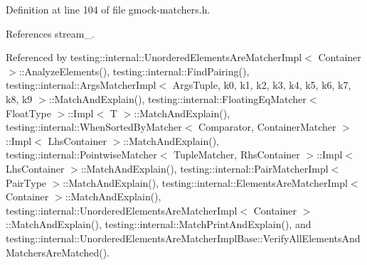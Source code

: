 Definition at line 104 of file gmock-\/matchers.\+h.



References stream\+\_\+.



Referenced by testing\+::internal\+::\+Unordered\+Elements\+Are\+Matcher\+Impl$<$ Container $>$\+::\+Analyze\+Elements(), testing\+::internal\+::\+Find\+Pairing(), testing\+::internal\+::\+Args\+Matcher\+Impl$<$ Args\+Tuple, k0, k1, k2, k3, k4, k5, k6, k7, k8, k9 $>$\+::\+Match\+And\+Explain(), testing\+::internal\+::\+Floating\+Eq\+Matcher$<$ Float\+Type $>$\+::\+Impl$<$ T $>$\+::\+Match\+And\+Explain(), testing\+::internal\+::\+When\+Sorted\+By\+Matcher$<$ Comparator, Container\+Matcher $>$\+::\+Impl$<$ Lhs\+Container $>$\+::\+Match\+And\+Explain(), testing\+::internal\+::\+Pointwise\+Matcher$<$ Tuple\+Matcher, Rhs\+Container $>$\+::\+Impl$<$ Lhs\+Container $>$\+::\+Match\+And\+Explain(), testing\+::internal\+::\+Pair\+Matcher\+Impl$<$ Pair\+Type $>$\+::\+Match\+And\+Explain(), testing\+::internal\+::\+Elements\+Are\+Matcher\+Impl$<$ Container $>$\+::\+Match\+And\+Explain(), testing\+::internal\+::\+Unordered\+Elements\+Are\+Matcher\+Impl$<$ Container $>$\+::\+Match\+And\+Explain(), testing\+::internal\+::\+Match\+Print\+And\+Explain(), and testing\+::internal\+::\+Unordered\+Elements\+Are\+Matcher\+Impl\+Base\+::\+Verify\+All\+Elements\+And\+Matchers\+Are\+Matched().


